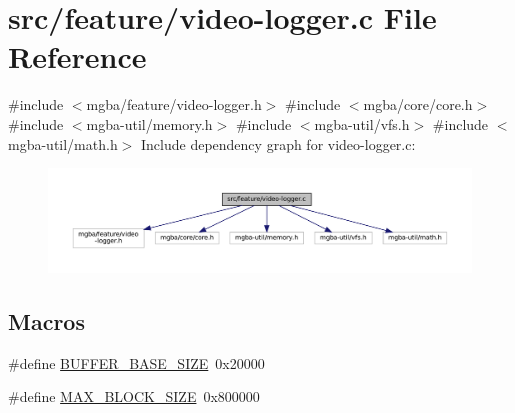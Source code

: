 \hypertarget{video-logger_8c}{}\section{src/feature/video-\/logger.c File Reference}
\label{video-logger_8c}
{\ttfamily \#include $<$mgba/feature/video-\/logger.\+h$>$}\newline
{\ttfamily \#include $<$mgba/core/core.\+h$>$}\newline
{\ttfamily \#include $<$mgba-\/util/memory.\+h$>$}\newline
{\ttfamily \#include $<$mgba-\/util/vfs.\+h$>$}\newline
{\ttfamily \#include $<$mgba-\/util/math.\+h$>$}\newline
Include dependency graph for video-\/logger.c\+:
\nopagebreak
\begin{figure}[H]
\begin{center}
\leavevmode
\includegraphics[width=350pt]{video-logger_8c__incl}
\end{center}
\end{figure}
\subsection*{Macros}
\begin{DoxyCompactItemize}
\item 
\#define \mbox{\hyperlink{video-logger_8c_a0ac864c0038cca0b382e3103f9a6f32e}{B\+U\+F\+F\+E\+R\+\_\+\+B\+A\+S\+E\+\_\+\+S\+I\+ZE}}~0x20000
\item 
\#define \mbox{\hyperlink{video-logger_8c_aa8bad2cd89820cdaf2a7f26392774014}{M\+A\+X\+\_\+\+B\+L\+O\+C\+K\+\_\+\+S\+I\+ZE}}~0x800000
\end{DoxyCompactItemize}
